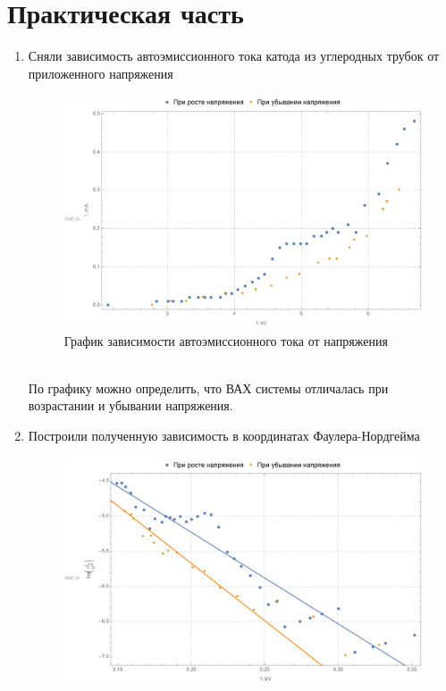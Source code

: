 \documentclass[a4paper, 12pt]{article}
\begin{document}
	\section{Практическая часть}
	\begin{enumerate}
		\item Сняли зависимость автоэмиссионного тока катода из углеродных трубок от приложенного напряжения
		\begin{figure}[!htb]
			\centering
			\includegraphics[scale=0.5]{fig1.pdf}
			\caption{График зависимости автоэмиссионного тока от напряжения}
		\end{figure}
		\\
		По графику можно определить, что ВАХ системы отличалась при возрастании и убывании напряжения.
		\item Построили полученную зависимость в координатах Фаулера-Нордгейма
		\begin{figure}[!htb]
			\centering
			\includegraphics[scale=0.55]{fig2.pdf}

\end{figure}
\end{enumerate}
\end{document}
